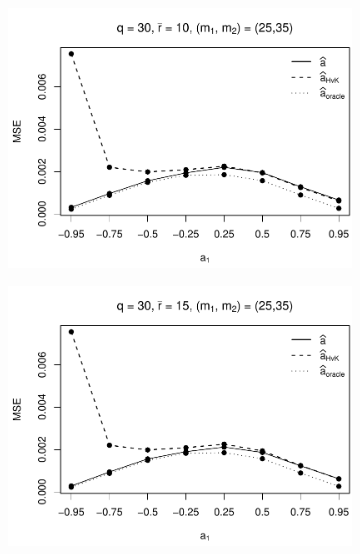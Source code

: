 \begin{figure}[h!]
\begin{subfigure}[b]{0.45\textwidth}
\includegraphics[width=\textwidth]{Plots/Robustness/MSE_a1_T=500_slope=1_(q,K1,K2,M1,M2)=(30,2,10,25,35).pdf}
\end{subfigure}
\hspace{0.25cm}
\begin{subfigure}[b]{0.45\textwidth}
\includegraphics[width=\textwidth]{Plots/Robustness/MSE_a1_T=500_slope=1_(q,K1,K2,M1,M2)=(30,2,15,25,35).pdf}
\end{subfigure}


\end{figure}
